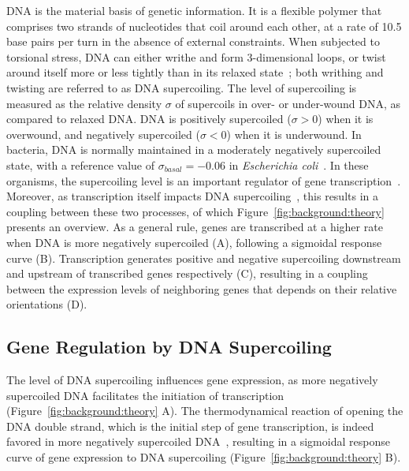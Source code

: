 DNA is the material basis of genetic information.
It is a flexible polymer that comprises two strands of nucleotides that coil around each other, at a rate of 10.5 base pairs per turn in the absence of external constraints.
When subjected to torsional stress, DNA can either writhe and form 3-dimensional loops, or twist around itself more or less tightly than in its relaxed state~\citep{travers2005}; both writhing and twisting are referred to as DNA supercoiling.
The level of supercoiling is measured as the relative density $\sigma$ of supercoils in over- or under-wound DNA, as compared to relaxed DNA.
DNA is positively supercoiled ($\sigma > 0$) when it is overwound, and negatively supercoiled ($\sigma < 0$) when it is underwound.
In bacteria, DNA is normally maintained in a moderately negatively supercoiled state, with a reference value of $\sigma_{basal}=-0.06$ in \emph{Escherichia coli}~\citep{travers2005}.
In these organisms, the supercoiling level is an important regulator of gene transcription~\citep{dorman2016}.
Moreover, as transcription itself impacts DNA supercoiling~\citep{liu1987}, this results in a coupling between these two processes, of which Figure~\ref{fig:background:theory} presents an overview.
As a general rule, genes are transcribed at a higher rate when DNA is more negatively supercoiled (A), following a sigmoidal response curve (B).
Transcription generates positive and negative supercoiling downstream and upstream of transcribed genes respectively (C), resulting in a coupling between the expression levels of neighboring genes that depends on their relative orientations (D).

\subsection{Gene Regulation by DNA Supercoiling}

The level of DNA supercoiling influences gene expression, as more negatively supercoiled DNA facilitates the initiation of transcription (Figure~\ref{fig:background:theory} A).
The thermodynamical reaction of opening the DNA double strand, which is the initial step of gene transcription, is indeed favored in more negatively supercoiled DNA~\citep{elhoudaigui2019}, resulting in a sigmoidal response curve of gene expression to DNA supercoiling (Figure~\ref{fig:background:theory} B).

